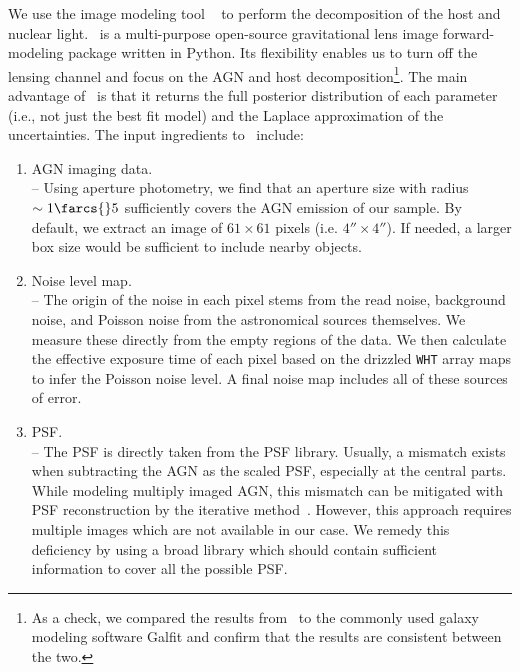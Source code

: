 \documentclass[apj]{emulateapj}
\begin{document}
We use the image modeling tool \lenstronomy~\citep{Birrer2015, lenstronomy} to perform the decomposition of the host and nuclear light. \lenstronomy\ is a multi-purpose open-source gravitational lens image forward-modeling package written in Python. 
Its flexibility enables us to turn off the lensing channel and focus on the AGN and host decomposition\footnote{As a check, we compared the results from \lenstronomy\ to the commonly used galaxy modeling software {\sc Galfit} and confirm that the results are consistent between the two.}. The main advantage of \lenstronomy\ is that it returns the full posterior distribution of each parameter (i.e., not just the best fit model) and the Laplace approximation of the uncertainties. The input ingredients to \lenstronomy\ include:
\begin{enumerate}
\item AGN imaging data. \\
-- Using aperture photometry, we find that an aperture size with radius $\sim1\farcs{}5$ sufficiently covers the AGN emission of our sample. By default, we extract an image of $61\times61$ pixels (i.e. $4''\times 4''$). If needed, a larger box size would be sufficient to include nearby objects. 
\item Noise level map.\\
-- The origin of the noise in each pixel stems from the read noise, background noise, and Poisson noise from the astronomical sources themselves. We measure these directly from the empty regions of the data. We then calculate the effective exposure time of each pixel based on the drizzled \texttt{WHT} array maps to infer the Poisson noise level. A final noise map includes all of these sources of error. 
  
\item PSF. \\
-- The PSF is directly taken from the PSF library. Usually, a mismatch exists when subtracting the AGN as the scaled PSF, especially at the central parts. While modeling multiply imaged AGN, this mismatch can be mitigated with PSF reconstruction by the iterative method~\citep{Chen2016, Birrer2018}.  However, this approach requires multiple images which are not available in our case.  We remedy this deficiency by using a broad library which should contain sufficient information to cover all the possible PSF. 
\end{enumerate}

\end{document}
